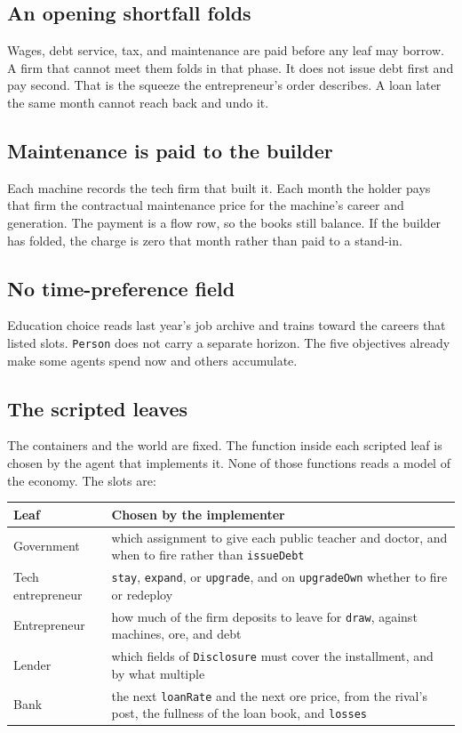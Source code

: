 \documentclass[11pt]{article}
\begin{document}
\subsection{An opening shortfall folds}

Wages, debt service, tax, and maintenance are paid before any leaf may
borrow. A firm that cannot meet them folds in that phase. It does not issue
debt first and pay second. That is the squeeze the entrepreneur's order
describes. A loan later the same month cannot reach back and undo it.

\subsection{Maintenance is paid to the builder}

Each machine records the tech firm that built it. Each month the holder pays
that firm the contractual maintenance price for the machine's career and
generation. The payment is a flow row, so the books still balance. If the
builder has folded, the charge is zero that month rather than paid to a
stand-in.

\subsection{No time-preference field}

Education choice reads last year's job archive and trains toward the careers
that listed slots. \texttt{Person} does not carry a separate horizon.
The five objectives already make some agents spend now and others accumulate.

\subsection{The scripted leaves}

The containers and the world are fixed. The function inside each scripted
leaf is chosen by the agent that implements it. None of those functions
reads a model of the economy. The slots are:

\begin{center}
\small
\begin{tabular}{@{}lp{9.0cm}@{}}
\toprule
Leaf & Chosen by the implementer \\
\midrule
Government &
which assignment to give each public teacher and doctor, and when to fire
rather than \texttt{issueDebt} \\
Tech entrepreneur &
\texttt{stay}, \texttt{expand}, or \texttt{upgrade}, and on
\texttt{upgradeOwn} whether to fire or redeploy \\
Entrepreneur &
how much of the firm deposits to leave for \texttt{draw}, against machines,
ore, and debt \\
Lender &
which fields of \texttt{Disclosure} must cover the installment, and by
what multiple \\
Bank &
the next \texttt{loanRate} and the next ore price, from the rival's post,
the fullness of the loan book, and \texttt{losses} \\
\bottomrule
\end{tabular}
\end{center}
\end{document}
